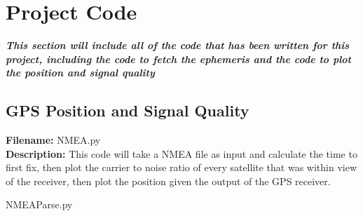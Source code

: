 
\chapter{Project Code} %

\label{AppendixA} %

\textbf{\emph{This section will include all of the code that has been written for this project, including the code to fetch the ephemeris and the code to plot the
position and signal quality}}

\section{GPS Position and Signal Quality}
\textbf{Filename:} NMEA.py\\
\textbf{Description:} This code will take a NMEA file as input and calculate the time to first fix, then plot the carrier to noise ratio of every satellite that was
within view of the receiver, then plot the position given the output of the GPS receiver.

\begin{lstinputlisting}[language=Python, caption=Python code to parse the receiver NMEA sentence and produce graphs]{NMEAParse.py}
\end{lstinputlisting}
